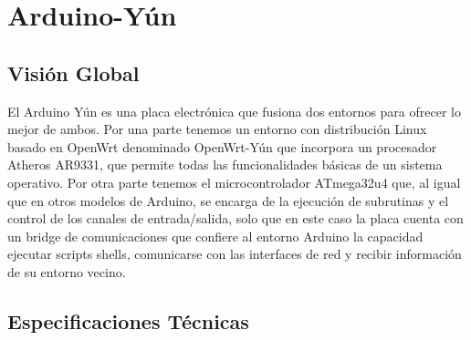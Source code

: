 \chapter{Arduino-Yún}
\label{chap:anexo3}

\section{Visión Global}

El Arduino Yún es una placa  electrónica que fusiona dos entornos para
ofrecer  lo mejor  de  ambos. Por  una parte  tenemos  un entorno  con
distribución  Linux  basado  en  OpenWrt  denominado  OpenWrt-Yún  que
incorpora  un  procesador  Atheros   AR9331,  que  permite  todas  las
funcionalidades  básicas  de un  sistema  operativo.   Por otra  parte
tenemos  el microcontrolador  ATmega32u4 que,  al igual  que en  otros
modelos de  Arduino, se  encarga de  la ejecución  de subrutinas  y el
control de los canales  de entrada/salida, solo que  en este caso la
placa cuenta con  un bridge de comunicaciones que  confiere al entorno
Arduino  la capacidad  ejecutar  scripts shells,  comunicarse con  las
interfaces de red y recibir información de su entorno vecino.

\section{Especificaciones Técnicas}

